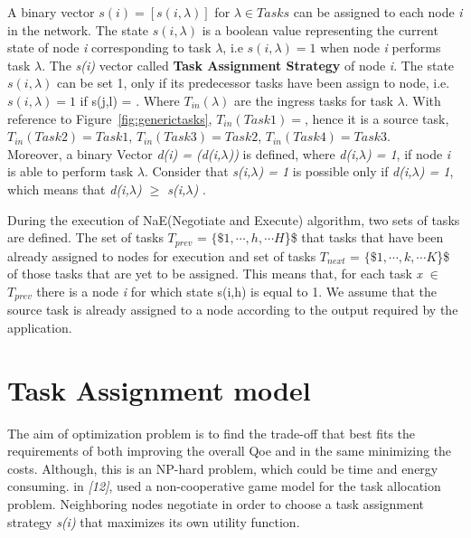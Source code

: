\documentclass[a4paper]{article}
\begin{document}
A binary vector $s(i) = [s(i, \lambda)]$ for $\lambda \in Tasks$ can be assigned to each node \textit{i} in the network. The state $s(i, \lambda)$ is a boolean value representing the current state of node \textit{i} corresponding to task $\lambda$, i.e $s(i,\lambda) = 1$ when node \textit{i} performs task $\lambda$. The \textit{s(i)} vector called \textbf{Task Assignment Strategy} of node \textit{i}. The state $s(i,\lambda)$ can be set 1, only if its predecessor tasks have been assign to node, i.e.  $s(i,\lambda) = 1$ if s(j,l) = . Where $T_{in}(\lambda)$ are the ingress tasks for task $\lambda$. With reference to Figure~\ref{fig:generictasks},  $T_{in}(Task1) = {}$, hence it is a source task, $T_{in}(Task2) = {Task1}$, $T_{in}(Task3) = {Task2}$, $T_{in}(Task4) = {Task3}$.    \\

Moreover, a binary Vector \textit{ d(i) = (d(i,$\lambda$))} is defined, where \textit{d(i,$\lambda$) = 1}, if node \textit{i} is able to perform task \textit{$\lambda$}. Consider that \textit{s(i,$\lambda$) = 1} is possible only if \textit{d(i,$\lambda$) = 1}, which means that \textit{d(i,$\lambda$) $\geq$  s(i,$\lambda$)} .

During the execution of NaE(Negotiate and Execute) algorithm, two sets of tasks are defined. The set of tasks $T_{prev}$ = $\{\$ 1,\cdots,h,\cdots H $\}\$
that tasks that have been already assigned to nodes for execution and set of tasks $T_{next}$ = $\{\$ 1,\cdots,k,\cdots K $\}\$ of those tasks that are yet to be assigned. This means that, for each task \textit{x} $\in$ $T_{prev}$ there is a node \textit{i} for which state s(i,h) is equal to 1. We assume that the source task is already assigned to a node according to the output required by the application. \\


\section{Task Assignment model}

The aim of optimization problem is to find the trade-off that best fits the requirements of both improving the overall Qoe  and in the same minimizing the costs. Although, this is an NP-hard problem, which could be time and energy consuming.  in \textit{[12]}, used a non-cooperative game model for the task allocation problem. Neighboring nodes negotiate in order to choose a task assignment strategy \textit{s(i)} that maximizes its own utility function.
\end{document}
